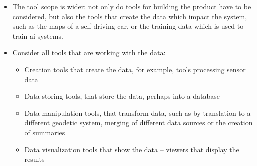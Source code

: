 \begin{itemize}
\item The tool scope is wider: not only do tools for building the product have to be considered,
  but also the tools that create the data which impact the system,
  such as the maps of a self-driving car, or the training data which is used to train \gls{ai} systems.
\item Consider all tools that are working with the data:
  \begin{itemize}
  \item Creation tools that create the data, for example, tools processing sensor data
  \item Data storing tools, that store the data, perhaps into a \gls{database}
  \item Data manipulation tools, that transform data, such as by translation to a different geodetic system, merging of different data sources or the creation of summaries
  \item Data visualization tools that show the data -- viewers that display the results
  \end{itemize}
  

\end{itemize}
